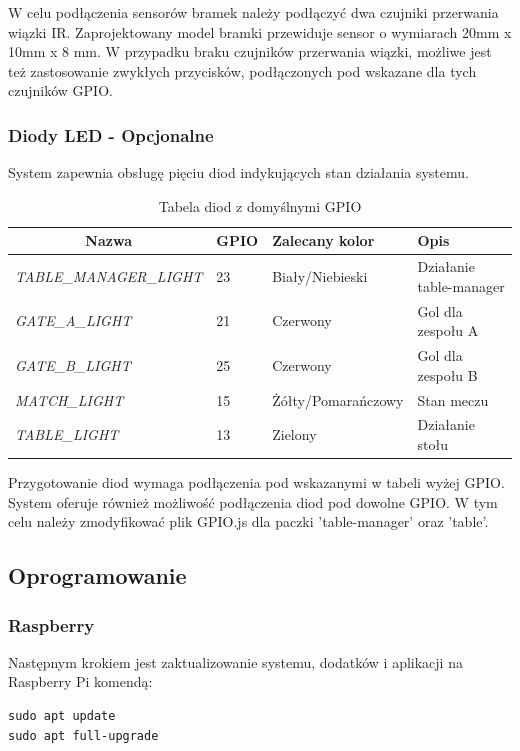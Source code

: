 W celu podłączenia sensorów bramek należy podłączyć dwa czujniki przerwania wiązki IR. Zaprojektowany model bramki przewiduje sensor o wymiarach 20mm x 10mm x 8 mm. W przypadku braku czujników przerwania wiązki, możliwe jest też zastosowanie zwykłych przycisków, podłączonych pod wskazane dla tych czujników GPIO.

\subsubsection{Diody LED - Opcjonalne}
System zapewnia obsługę pięciu diod indykujących stan działania systemu.

\begin{table}[h!]
\centering
\begin{tabular}{|l|l|l|l|}
\hline
\multicolumn{1}{|c|}{\textbf{Nazwa}} & \multicolumn{1}{c|}{\textbf{GPIO}} & \textbf{Zalecany kolor} & \textbf{Opis} \\ \hline
\textit{TABLE\_MANAGER\_LIGHT} & 23 & Biały/Niebieski & Działanie table-manager \\ \hline
\textit{GATE\_A\_LIGHT} & 21 & Czerwony & Gol dla zespołu A \\ \hline
\textit{GATE\_B\_LIGHT} & 25 & Czerwony & Gol dla zespołu B \\ \hline
\textit{MATCH\_LIGHT} & 15 & Żółty/Pomarańczowy & Stan meczu \\ \hline
\textit{TABLE\_LIGHT} & 13 & Zielony & Działanie stołu \\ \hline
\end{tabular}
\caption{Tabela diod z domyślnymi GPIO}
\end{table}

Przygotowanie diod wymaga podłączenia pod wskazanymi w tabeli wyżej GPIO. System oferuje również możliwość podłączenia diod pod dowolne GPIO. W tym celu należy zmodyfikować plik GPIO.js dla paczki 'table-manager' oraz 'table'.

\subsection{Oprogramowanie}

\subsubsection{Raspberry}

Następnym krokiem jest zaktualizowanie systemu, dodatków i aplikacji na Raspberry Pi komendą:

\begin{lstlisting}[caption={Aktualizacja Raspberry Pi}]
sudo apt update
sudo apt full-upgrade
\end{lstlisting}

